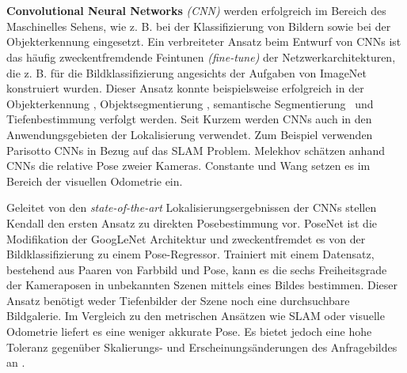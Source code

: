 \\\\
\textbf{Convolutional Neural Networks} \textit{(CNN)} werden erfolgreich im Bereich des Maschinelles Sehens, wie z. B. bei der Klassifizierung von Bildern \cite{krizhevskyImageNetClassificationDeep2012, simonyanVeryDeepConvolutional2014, heDeepResidualLearning2015} sowie bei der Objekterkennung \cite{girshickRichFeatureHierarchies2013, renFasterRCNNRealTime2015b, girshickFastRCNN2015} eingesetzt. 
Ein verbreiteter Ansatz beim Entwurf von CNNs ist das häufig zweckentfremdende Feintunen \textit{(fine-tune)} der Netzwerkarchitekturen, die z. B. für die Bildklassifizierung angesichts der Aufgaben von ImageNet \cite{russakovskyImageNetLargeScale2014} konstruiert wurden. Dieser Ansatz konnte beispielsweise erfolgreich in der Objekterkennung \cite{girshickFastRCNN2015}, Objektsegmentierung \cite{kokkinosPushingBoundariesBoundary2015, maninisConvolutionalOrientedBoundaries2016}, semantische Segmentierung \cite{nohLearningDeconvolutionNetwork2015, hazirbasFuseNetIncorporatingDepth2017a} und Tiefenbestimmung \cite{liDepthSurfaceNormal2015} verfolgt werden.
Seit Kurzem werden CNNs auch in den Anwendungsgebieten der Lokalisierung verwendet. Zum Beispiel verwenden Parisotto \etal\cite{parisottoGlobalPoseEstimation2018} CNNs in Bezug auf das SLAM Problem. Melekhov \etal\cite{melekhovRelativeCameraPose2017} schätzen anhand CNNs die relative Pose zweier Kameras. Constante \etal\cite{costanteExploringRepresentationLearning2016} und Wang \etal\cite{wangDeepVOEndtoendVisual2017} setzen es im Bereich der visuellen Odometrie ein.

Geleitet von den \textit{state-of-the-art} Lokalisierungsergebnissen der CNNs stellen Kendall \etal\cite{kendallPoseNetConvolutionalNetwork2015} den ersten Ansatz zu direkten Posebestimmung vor. PoseNet \cite{kendallPoseNetConvolutionalNetwork2015} ist die Modifikation der GoogLeNet \cite{szegedyGoingDeeperConvolutions2015} Architektur und zweckentfremdet es von der Bildklassifizierung zu einem Pose-Regressor. Trainiert mit einem Datensatz, bestehend aus Paaren von Farbbild und Pose, kann es die sechs Freiheitsgrade der Kameraposen in unbekannten Szenen mittels eines Bildes bestimmen. Dieser Ansatz benötigt weder Tiefenbilder der Szene noch eine durchsuchbare Bildgalerie. Im Vergleich zu den metrischen Ansätzen wie SLAM oder visuelle Odometrie liefert es eine weniger akkurate Pose. Es bietet jedoch eine hohe Toleranz gegenüber Skalierungs- und Erscheinungsänderungen des Anfragebildes an \cite{piascoSurveyVisualBasedLocalization2018}.


